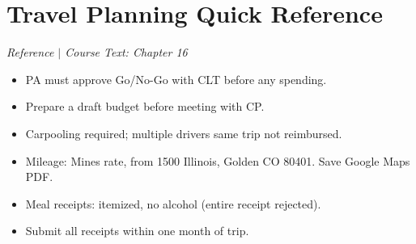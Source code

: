 \section{Travel Planning Quick Reference}
\textit{Reference $|$ Course Text: Chapter 16}

\begin{itemize}[nosep,leftmargin=1.5em]
\item PA must approve Go/No-Go with CLT before any spending.
\item Prepare a draft budget before meeting with CP.
\item Carpooling required; multiple drivers same trip not reimbursed.
\item Mileage: Mines rate, from 1500 Illinois, Golden CO 80401. Save Google Maps PDF.
\item Meal receipts: itemized, no alcohol (entire receipt rejected).
\item Submit all receipts within one month of trip.
\end{itemize}


